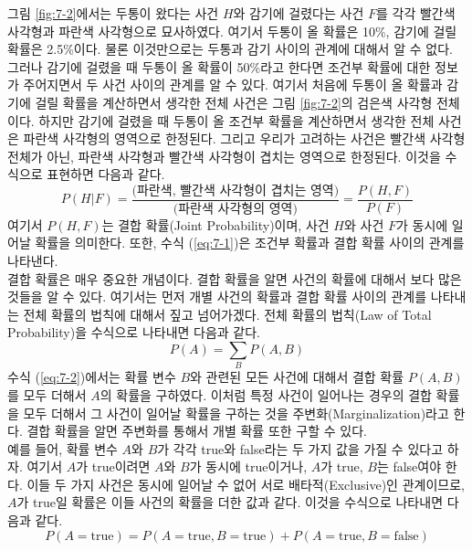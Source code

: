 \documentclass[a4paper]{oblivoir}
\begin{document}
그림 \ref{fig:7-2}에서는 두통이 왔다는 사건 $H$와 감기에 걸렸다는 사건 $F$를 각각 빨간색 사각형과 파란색 사각형으로 묘사하였다. 여기서 두통이 올 확률은 10\%, 감기에 걸릴 확률은 2.5\%이다. 물론 이것만으로는 두통과 감기 사이의 관계에 대해서 알 수 없다. 그러나 감기에 걸렸을 때 두통이 올 확률이 50\%라고 한다면 조건부 확률에 대한 정보가 주어지면서 두 사건 사이의 관계를 알 수 있다. 여기서 처음에 두통이 올 확률과 감기에 걸릴 확률을 계산하면서 생각한 전체 사건은 그림 \ref{fig:7-2}의 검은색 사각형 전체이다. 하지만 감기에 걸렸을 때 두통이 올 조건부 확률을 계산하면서 생각한 전체 사건은 파란색 사각형의 영역으로 한정된다. 그리고 우리가 고려하는 사건은 빨간색 사각형 전체가 아닌, 파란색 사각형과 빨간색 사각형이 겹치는 영역으로 한정된다. 이것을 수식으로 표현하면 다음과 같다.  
\begin{equation}
P(H|F) = \frac{\textrm{(파란색, 빨간색 사각형이 겹치는 영역)}}{\textrm{(파란색 사각형의 영역)}} = \frac{P(H,F)}{P(F)}
\label{eq:7-1}
\end{equation}
\noindent 여기서 $P(H,F)$는 결합 확률(Joint Probability)이며, 사건 $H$와 사건 $F$가 동시에 일어날 확률을 의미한다. 또한, 수식 (\ref{eq:7-1})은 조건부 확률과 결합 확률 사이의 관계를 나타낸다. \\

결합 확률은 매우 중요한 개념이다. 결합 확률을 알면 사건의 확률에 대해서 보다 많은 것들을 알 수 있다. 여기서는 먼저 개별 사건의 확률과 결합 확률 사이의 관계를 나타내는 전체 확률의 법칙에 대해서 짚고 넘어가겠다. 전체 확률의 법칙(Law of Total Probability)을 수식으로 나타내면 다음과 같다. 
\begin{equation}
P(A) = \sum_{B} P(A,B)
\label{eq:7-2}
\end{equation}
\noindent 수식 (\ref{eq:7-2})에서는 확률 변수 $B$와 관련된 모든 사건에 대해서 결합 확률 $P(A,B)$를 모두 더해서 $A$의 확률을 구하였다. 이처럼 특정 사건이 일어나는 경우의 결합 확률을 모두 더해서 그 사건이 일어날 확률을 구하는 것을 주변화(Marginalization)라고 한다. 결합 확률을 알면 주변화를 통해서 개별 확률 또한 구할 수 있다. \\

예를 들어, 확률 변수 $A$와 $B$가 각각 true와 false라는 두 가지 값을 가질 수 있다고 하자. 여기서 $A$가 true이려면 $A$와 $B$가 동시에 true이거나, $A$가 true, $B$는 false여야 한다. 이들 두 가지 사건은 동시에 일어날 수 없어 서로 배타적(Exclusive)인 관계이므로, $A$가 true일 확률은 이들 사건의 확률을 더한 값과 같다. 이것을 수식으로 나타내면 다음과 같다.
\begin{equation}
P(A = \mathrm{true}) = P(A = \mathrm{true}, B = \mathrm{true}) + P(A = \mathrm{true}, B = \mathrm{false})
\label{eq:7-3}
\end{equation}
\end{document}
